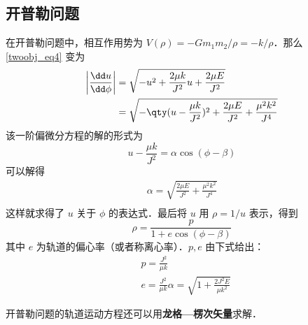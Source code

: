 \subsection{开普勒问题}
在开普勒问题中，相互作用势为 $V(\rho)=-Gm_1m_2/\rho=-k/\rho$．那么 \autoref{twoobj_eq4} 变为
\begin{equation}
\begin{aligned}
\left|\frac{\dd u}{\dd \phi}\right|&=\sqrt{-u^2+\frac{2\mu k}{J^2}u+\frac{2\mu E}{J^2}}\\
&=\sqrt{-\qty(u-\frac{\mu k}{J^2})^2+\frac{2\mu E}{J^2}+\frac{\mu^2 k^2}{J^4}}
\end{aligned}
\end{equation}
该一阶偏微分方程的解的形式为
\begin{equation}
u-\frac{\mu k}{J^2}=\alpha\cos(\phi-\beta)
\end{equation}
可以解得
\begin{equation}
\begin{aligned}
\alpha=\sqrt{\frac{2\mu E}{J^2}+\frac{\mu^2 k^2}{J^4}}\\
\end{aligned}
\end{equation}
这样就求得了 $u$ 关于 $\phi$ 的表达式．最后将 $u$ 用 $\rho=1/u$ 表示，得到
\begin{equation}
\rho=\frac{p}{1+e\cos(\phi-\beta)}
\end{equation}
其中 $e$ 为轨道的偏心率（或者称离心率）．$p,e$ 由下式给出：
\begin{equation}
\begin{aligned}
&p=\frac{J^2}{\mu k}\\
&e=\frac{J^2}{\mu k}\alpha=\sqrt{1+\frac{2J^2E}{\mu k^2}}
\end{aligned}
\end{equation}

开普勒问题的轨道运动方程还可以用\textbf{龙格—楞次矢量}求解．

